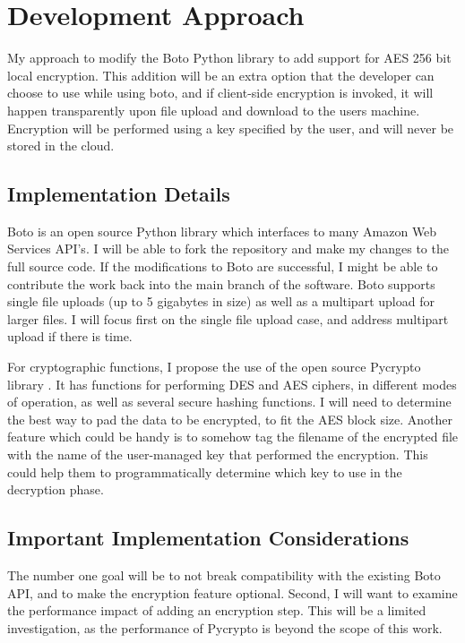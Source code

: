 \section{Development Approach}

My approach to modify the Boto Python library to add support for AES 256 bit local encryption. 
This addition will be an extra option that the developer can choose to use while using boto, and if client-side encryption
is invoked, it will happen transparently upon file upload and download to the users machine. Encryption will be performed
using a key specified by the user, and will never be stored in the cloud.

\subsection{Implementation Details}

Boto is an open source Python library which interfaces to many Amazon Web Services API's. I will be able to fork the repository and make my changes to the full source code.
If the modifications to Boto are successful, I might be able to contribute the work back into the main branch of the software.
Boto supports single file uploads (up to 5 gigabytes in size) as well as a multipart upload for larger files. I will focus first on the single file upload case, and address multipart upload if there is time.

For cryptographic functions, I propose the use of the open source Pycrypto library \cite{pycrypto}. It has functions for performing DES and AES ciphers, in different modes of operation, as well as several secure hashing functions.
I will need to determine the best way to pad the data to be encrypted, to fit the AES block size. Another feature which could be handy is to somehow tag the filename of the encrypted file with the name of the user-managed key that performed the encryption. This could help them to programmatically determine which key to use in the decryption phase.

\subsection{Important Implementation Considerations}
The number one goal will be to not break compatibility with the existing Boto API, and to make the encryption feature optional. Second, I will want to examine the performance impact of adding an encryption step.
This will be a limited investigation, as the performance of Pycrypto is beyond the scope of this work.

